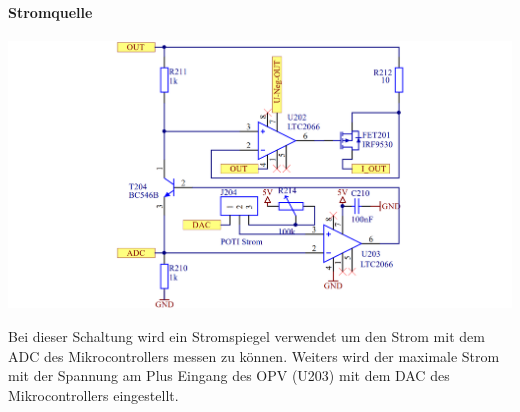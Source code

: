 \documentclass[paper=a4, 12pt]{scrreprt}
\begin{document}
			\paragraph{Stromquelle}\hfill \break
			\begin{adjustbox}{center,caption={Schaltung für die Einstellbare Stromquelle},label={fig:stromquelle},nofloat=figure,vspace=\bigskipamount}
				\includegraphics[width=\textwidth]{img/Stromquelle_SEPIC.PNG}
			\end{adjustbox}
			Bei dieser Schaltung wird ein Stromspiegel verwendet um den Strom mit dem ADC des Mikrocontrollers messen zu können. Weiters wird der maximale Strom mit der Spannung am Plus Eingang des OPV (U203) mit dem DAC des Mikrocontrollers eingestellt.\newpage
			
\end{document}
